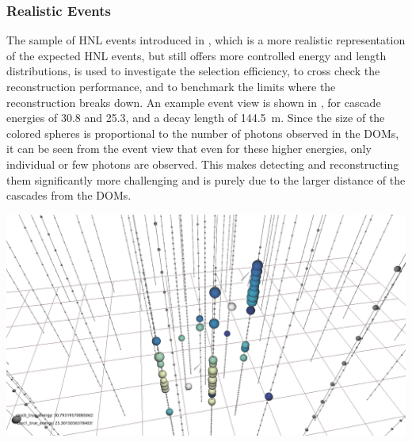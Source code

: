 \subsubsection{Realistic Events}

The sample of HNL events introduced in , which is a more realistic representation of the expected HNL events, but still offers more controlled energy and length distributions, is used to investigate the selection efficiency, to cross check the reconstruction performance, and to benchmark the limits where the reconstruction breaks down. An example event view is shown in , for cascade energies of \SI{30.8}{\gev} and \SI{25.3}{\gev}, and a decay length of \SI{144.5}{\meter}. Since the size of the colored spheres is proportional to the number of photons observed in the DOMs, it can be seen from the event view that even for these higher energies, only individual or few photons are observed. This makes detecting and reconstructing them significantly more challenging and is purely due to the larger distance of the cascades from the DOMs.

\begin{marginfigure}
    \centering
    \includegraphics[trim=230 45 230 65, clip]{figures/model_independent_simulation/diagonal_e0_30.8_e1_25.3_v0.png}
    \caption[Event view of a realistic double cascade event]{Event view of a realistic double cascade event, with cascade energies of \SI{30.8}{\gev} and \SI{25.3}{\gev}, and a decay length of \SI{144.5}{\meter}. The colored spheres show the DOMs that have observed light, where the size is proportional to the number of observed photons and the color indicates the time (yellow is early, blue is late). The strings are shown as black lines, with small spheres indicating the DOM positions, and the true cascade vertices and directions are shown as white spheres with white arrows.}
\end{marginfigure}


